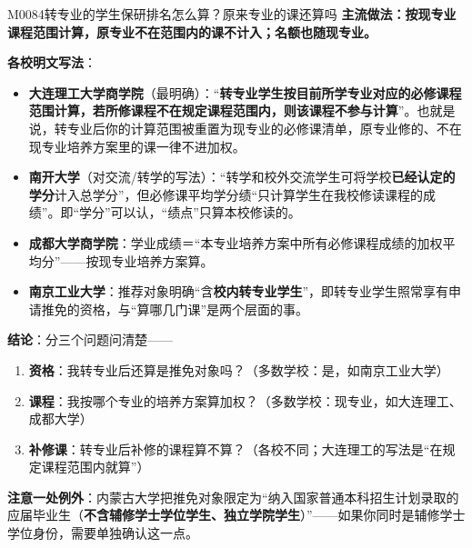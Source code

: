 \begin{qa}{M0084}{转专业的学生保研排名怎么算？原来专业的课还算吗}
\textbf{主流做法：按现专业课程范围计算，原专业不在范围内的课不计入；名额也随现专业。}

\textbf{各校明文写法}：

\begin{itemize}
  \item \textbf{大连理工大学商学院}（最明确）：“\textbf{转专业学生按目前所学专业对应的必修课程范围计算，若所修课程不在规定课程范围内，则该课程不参与计算}”。也就是说，转专业后你的计算范围被重置为现专业的必修课清单，原专业修的、不在现专业培养方案里的课一律不进加权。
  \item \textbf{南开大学}（对交流/转学的写法）：“转学和校外交流学生可将学校\textbf{已经认定的学分}计入总学分”，但必修课平均学分绩“只计算学生在我校修读课程的成绩”。即“学分”可以认，“绩点”只算本校修读的。
  \item \textbf{成都大学商学院}：学业成绩＝“本专业培养方案中所有必修课程成绩的加权平均分”——按现专业培养方案算。
  \item \textbf{南京工业大学}：推荐对象明确“含\textbf{校内转专业学生}”，即转专业学生照常享有申请推免的资格，与“算哪几门课”是两个层面的事。
\end{itemize}

\textbf{结论}：分三个问题问清楚——
\begin{enumerate}
  \item \textbf{资格}：我转专业后还算是推免对象吗？（多数学校：是，如南京工业大学）
  \item \textbf{课程}：我按哪个专业的培养方案算加权？（多数学校：现专业，如大连理工、成都大学）
  \item \textbf{补修课}：转专业后补修的课程算不算？（各校不同；大连理工的写法是“在规定课程范围内就算”）
\end{enumerate}

\textbf{注意一处例外}：内蒙古大学把推免对象限定为“纳入国家普通本科招生计划录取的应届毕业生（\textbf{不含辅修学士学位学生、独立学院学生}）”——如果你同时是辅修学士学位身份，需要单独确认这一点。
\end{qa}


